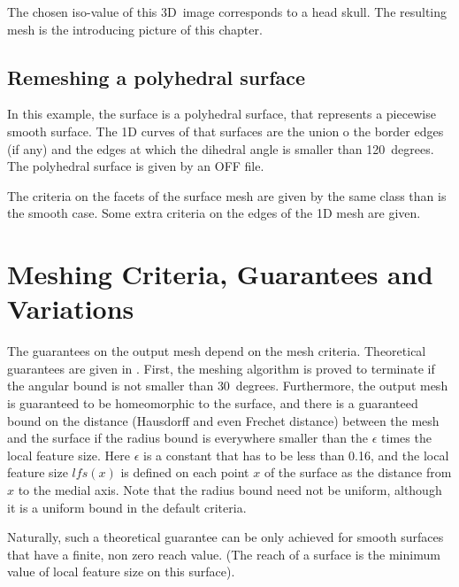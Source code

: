 The chosen iso-value of this 3D~image corresponds to a head skull. The
resulting mesh is the introducing picture of this chapter.


\subsection{Remeshing a polyhedral surface}
In this example, the surface is a polyhedral surface, that represents a
piecewise smooth surface. The 1D curves of that surfaces are the union o
the border edges (if any) and the edges at which the dihedral angle is
smaller than 120~degrees. The polyhedral surface is given by an OFF file.

The criteria on the facets of the surface mesh are given by the same class
than is the smooth case. Some extra criteria on the edges of the 1D mesh
are given.


\section{Meshing Criteria, Guarantees and Variations\label{SurfaceMesher_section_criteria}}
\label{SurfaceMesher_section_variations}

The guarantees on the output mesh depend on the mesh criteria.
Theoretical guarantees are given in \cite{cgal:bo-pgsms-05}.
First, the meshing algorithm is proved to terminate 
if the angular bound is
not smaller than $30$~degrees. 
Furthermore, the output mesh 
is guaranteed to be homeomorphic to the surface,
and  there is a guaranteed bound 
on the  distance (Hausdorff and even Frechet distance)
between the mesh and the surface
if the radius bound is everywhere smaller than 
the $\epsilon$ times the local feature size. 
Here $\epsilon$ is a constant that has to be
less than 0.16, and the local feature size 
$lfs(x)$ is defined on each point $x$ of the surface
as the distance from $x$ to the medial axis.  
Note that the radius bound need not be uniform,
although it is a uniform bound in the default criteria.

Naturally, such a theoretical guarantee can be only achieved
for smooth surfaces that have a finite, non zero
reach value. (The reach of a surface is the minimum value 
of local feature size on
this surface).

